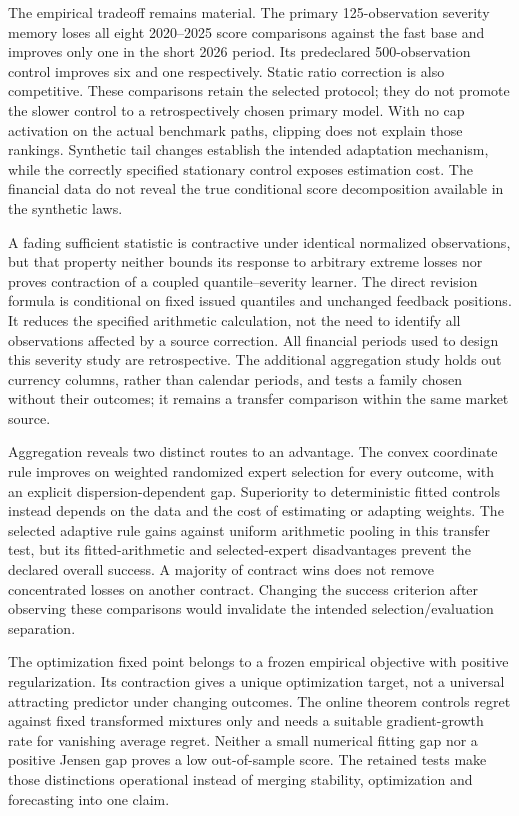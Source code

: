 \documentclass[11pt,a4paper]{article}
\theoremstyle{definition}\newtheorem{definition}[theorem]{Definition}
\begin{document}
The empirical tradeoff remains material. The primary 125-observation severity memory loses all eight 2020--2025 score comparisons against the fast base and improves only one in the short 2026 period. Its predeclared 500-observation control improves six and one respectively. Static ratio correction is also competitive. These comparisons retain the selected protocol; they do not promote the slower control to a retrospectively chosen primary model. With no cap activation on the actual benchmark paths, clipping does not explain those rankings. Synthetic tail changes establish the intended adaptation mechanism, while the correctly specified stationary control exposes estimation cost. The financial data do not reveal the true conditional score decomposition available in the synthetic laws.

A fading sufficient statistic is contractive under identical normalized observations, but that property neither bounds its response to arbitrary extreme losses nor proves contraction of a coupled quantile--severity learner. The direct revision formula is conditional on fixed issued quantiles and unchanged feedback positions. It reduces the specified arithmetic calculation, not the need to identify all observations affected by a source correction. All financial periods used to design this severity study are retrospective. The additional aggregation study holds out currency columns, rather than calendar periods, and tests a family chosen without their outcomes; it remains a transfer comparison within the same market source.

Aggregation reveals two distinct routes to an advantage. The convex coordinate rule improves on weighted randomized expert selection for every outcome, with an explicit dispersion-dependent gap. Superiority to deterministic fitted controls instead depends on the data and the cost of estimating or adapting weights. The selected adaptive rule gains against uniform arithmetic pooling in this transfer test, but its fitted-arithmetic and selected-expert disadvantages prevent the declared overall success. A majority of contract wins does not remove concentrated losses on another contract. Changing the success criterion after observing these comparisons would invalidate the intended selection/evaluation separation.

The optimization fixed point belongs to a frozen empirical objective with positive regularization. Its contraction gives a unique optimization target, not a universal attracting predictor under changing outcomes. The online theorem controls regret against fixed transformed mixtures only and needs a suitable gradient-growth rate for vanishing average regret. Neither a small numerical fitting gap nor a positive Jensen gap proves a low out-of-sample score. The retained tests make those distinctions operational instead of merging stability, optimization and forecasting into one claim.
\end{document}
